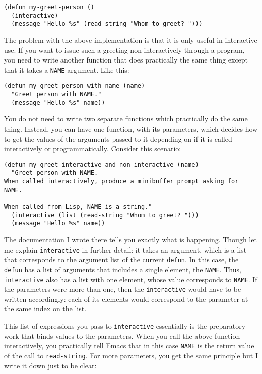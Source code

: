 \documentclass[11pt]{ctexart}
\begin{document}
\begin{verbatim}
(defun my-greet-person ()
  (interactive)
  (message "Hello %s" (read-string "Whom to greet? ")))
\end{verbatim}

The problem with the above implementation is that it is only useful in interactive use. If you want to issue such a greeting non-interactively through a program, you need to write another function that does practically the same thing except that it takes a \texttt{NAME} argument. Like this:

\begin{verbatim}
(defun my-greet-person-with-name (name)
  "Greet person with NAME."
  (message "Hello %s" name))
\end{verbatim}

You do not need to write two separate functions which practically do the same thing. Instead, you can have one function, with its parameters, which decides how to get the values of the arguments passed to it depending on if it is called interactively or programmatically. Consider this scenario:

\begin{verbatim}
(defun my-greet-interactive-and-non-interactive (name)
  "Greet person with NAME.
When called interactively, produce a minibuffer prompt asking for NAME.

When called from Lisp, NAME is a string."
  (interactive (list (read-string "Whom to greet? ")))
  (message "Hello %s" name))
\end{verbatim}

The documentation I wrote there tells you exactly what is happening. Though let me explain \texttt{interactive} in further detail: it takes an argument, which is a list that corresponds to the argument list of the current \texttt{defun}. In this case, the \texttt{defun} has a list of arguments that includes a single element, the \texttt{NAME}. Thus, \texttt{interactive} also has a list with one element, whose value corresponds to \texttt{NAME}. If the parameters were more than one, then the \texttt{interactive} would have to be written accordingly: each of its elements would correspond to the parameter at the same index on the list.

This list of expressions you pass to \texttt{interactive} essentially is the preparatory work that binds values to the parameters. When you call the above function interactively, you practically tell Emacs that in this case \texttt{NAME} is the return value of the call to \texttt{read-string}. For more parameters, you get the same principle but I write it down just to be clear:
\end{document}
